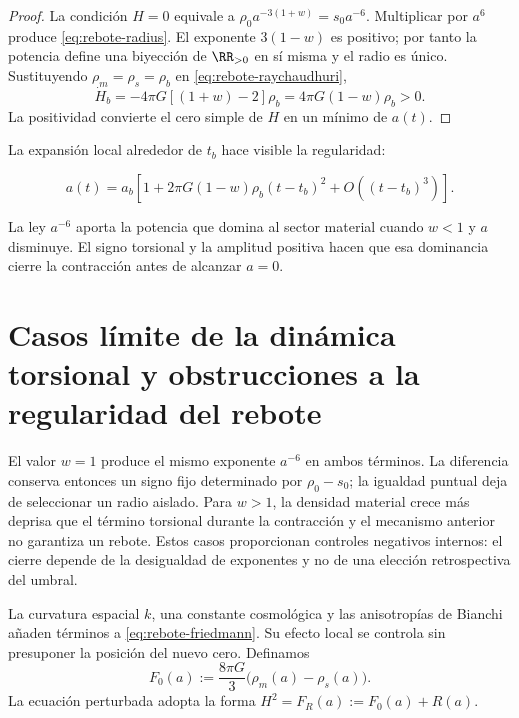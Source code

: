 \begin{proof}
La condici\'on \(H=0\) equivale a
\(\rho_0a^{-3(1+w)}=s_0a^{-6}\).  Multiplicar por \(a^6\) produce
\cref{eq:rebote-radius}.  El exponente \(3(1-w)\) es positivo; por tanto la
potencia define una biyecci\'on de \(\RR_{>0}\) en s\'i misma y el radio es
\'unico.  Sustituyendo \(\rho_m=\rho_s=\rho_b\) en
\cref{eq:rebote-raychaudhuri},
\[
 \dot H_b=-4\pi G[(1+w)-2]\rho_b
 =4\pi G(1-w)\rho_b>0.
\]
La positividad convierte el cero simple de \(H\) en un m\'inimo de \(a(t)\).
\end{proof}

La expansi\'on local alrededor de \(t_b\) hace visible la regularidad:

\begin{equation}
 a(t)=a_b\left[
 1+2\pi G(1-w)\rho_b(t-t_b)^2
 +O\!\left((t-t_b)^3\right)
 \right].
 \label{eq:rebote-local-expansion}
\end{equation}

La ley \(a^{-6}\) aporta la potencia que domina al sector material cuando
\(w<1\) y \(a\) disminuye.  El signo torsional y la amplitud positiva hacen
que esa dominancia cierre la contracci\'on antes de alcanzar \(a=0\).

\section{Casos límite de la dinámica torsional y obstrucciones a la regularidad del rebote}

El valor \(w=1\) produce el mismo exponente \(a^{-6}\) en ambos t\'erminos.
La diferencia conserva entonces un signo fijo determinado por
\(\rho_0-s_0\); la igualdad puntual deja de seleccionar un radio aislado.
Para \(w>1\), la densidad material crece m\'as deprisa que el t\'ermino
torsional durante la contracci\'on y el mecanismo anterior no garantiza un
rebote.  Estos casos proporcionan controles negativos internos: el cierre
depende de la desigualdad de exponentes y no de una elecci\'on retrospectiva
del umbral.

La curvatura espacial \(k\), una constante cosmol\'ogica y las anisotrop\'ias
de Bianchi a\~naden t\'erminos a \cref{eq:rebote-friedmann}. Su efecto local
se controla sin presuponer la posici\'on del nuevo cero. Definamos
\[
 F_0(a):=\frac{8\pi G}{3}\bigl(\rho_m(a)-\rho_s(a)\bigr).
\]
La ecuaci\'on perturbada adopta la forma
\(H^2=F_R(a):=F_0(a)+R(a)\).

